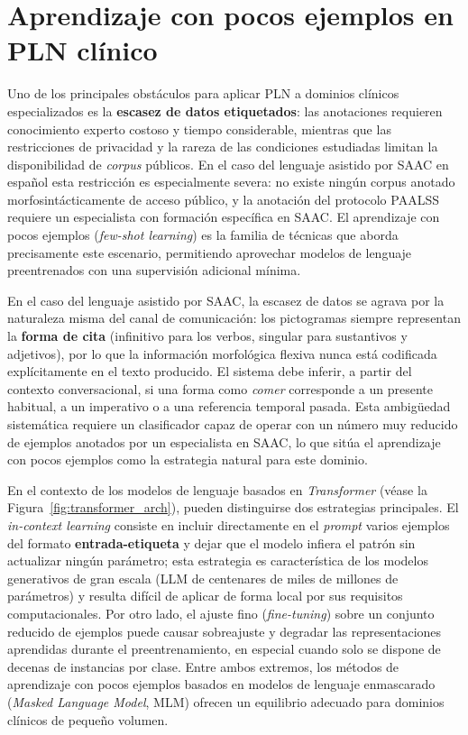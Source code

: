 \newpage
\section{Aprendizaje con pocos ejemplos en PLN clínico}
\label{sec:fewshot}

Uno de los principales obstáculos para aplicar \ac{PLN} a dominios clínicos
especializados es la \textbf{escasez de datos etiquetados}: las anotaciones requieren
conocimiento experto costoso y tiempo considerable, mientras que las restricciones de
privacidad y la rareza de las condiciones estudiadas limitan la disponibilidad de
\emph{corpus} públicos. En el caso del lenguaje asistido por \ac{SAAC} en español esta
restricción es especialmente severa: no existe ningún corpus anotado
morfosintácticamente de acceso público, y la anotación del protocolo \ac{PAALSS}
requiere un especialista con formación específica en \ac{SAAC}. El aprendizaje con
pocos ejemplos (\emph{few-shot learning}) es la familia de técnicas que aborda
precisamente este escenario, permitiendo aprovechar modelos de lenguaje preentrenados
con una supervisión adicional mínima.

En el caso del lenguaje asistido por \ac{SAAC}, la escasez de datos se agrava por la
naturaleza misma del canal de comunicación: los pictogramas siempre representan la
\textbf{forma de cita} (infinitivo para los verbos, singular para sustantivos y adjetivos),
por lo que la información morfológica flexiva nunca está codificada explícitamente en
el texto producido. El sistema debe inferir, a partir del contexto conversacional, si
una forma como \emph{comer} corresponde a un presente habitual, a un imperativo o a
una referencia temporal pasada. Esta ambigüedad sistemática requiere un clasificador
capaz de operar con un número muy reducido de ejemplos anotados por un especialista
en \ac{SAAC}, lo que sitúa el aprendizaje con pocos ejemplos como la estrategia
natural para este dominio.

En el contexto de los modelos de lenguaje basados en \emph{Transformer}
(véase la Figura~\ref{fig:transformer_arch}), pueden
distinguirse dos estrategias principales. El \emph{in-context learning} consiste en
incluir directamente en el \emph{prompt} varios ejemplos del formato \textbf{entrada-etiqueta}
y dejar que el modelo infiera el patrón sin actualizar ningún parámetro; esta
estrategia es característica de los modelos generativos de gran escala (\ac{LLM} de
centenares de miles de millones de parámetros) y resulta difícil de aplicar de forma
local por sus requisitos computacionales. Por otro lado, el ajuste fino
(\emph{fine-tuning}) sobre un conjunto reducido de ejemplos puede causar
sobreajuste y degradar las representaciones aprendidas durante el preentrenamiento,
en especial cuando solo se dispone de decenas de instancias por clase. Entre ambos
extremos, los métodos de aprendizaje con pocos ejemplos basados en modelos de lenguaje
enmascarado (\emph{Masked Language Model}, \ac{MLM}) ofrecen un equilibrio adecuado
para dominios clínicos de pequeño volumen.

